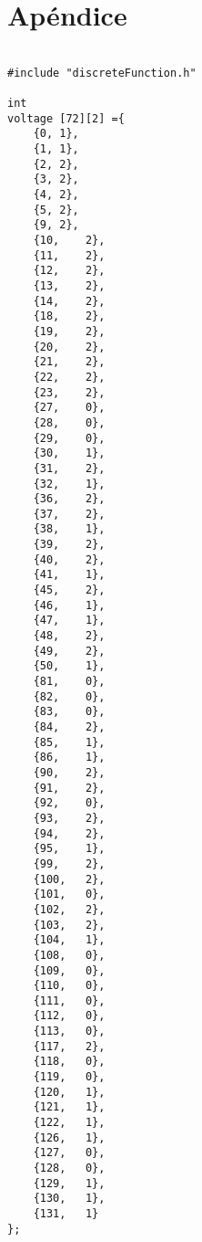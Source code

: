 \chapter{Apéndice}\label{ch:appendix}

\begin{lstlisting}[caption=Modelo discreto de la vía de señalización. Implementación en C]

#include "discreteFunction.h"

int
voltage [72][2] ={
	{0,	1},
	{1,	1},
	{2,	2},
	{3,	2},
	{4,	2},
	{5,	2},
	{9,	2},
	{10,	2},
	{11,	2},
	{12,	2},
	{13,	2},
	{14,	2},
	{18,	2},
	{19,	2},
	{20,	2},
	{21,	2},
	{22,	2},
	{23,	2},
	{27,	0},
	{28,	0},
	{29,	0},
	{30,	1},
	{31,	2},
	{32,	1},
	{36,	2},
	{37,	2},
	{38,	1},
	{39,	2},
	{40,	2},
	{41,	1},
	{45,	2},
	{46,	1},
	{47,	1},
	{48,	2},
	{49,	2},
	{50,	1},
	{81,	0},
	{82,	0},
	{83,	0},
	{84,	2},
	{85,	1},
	{86,	1},
	{90,	2},
	{91,	2},
	{92,	0},
	{93,	2},
	{94,	2},
	{95,	1},
	{99,	2},
	{100,	2},
	{101,	0},
	{102,	2},
	{103,	2},
	{104,	1},
	{108,	0},
	{109,	0},
	{110,	0},
	{111,	0},
	{112,	0},
	{113,	0},
	{117,	2},
	{118,	0},
	{119,	0},
	{120,	1},
	{121,	1},
	{122,	1},
	{126,	1},
	{127,	0},
	{128,	0},
	{129,	1},
	{130,	1},
	{131,	1}
};


\end{lstlisting}
